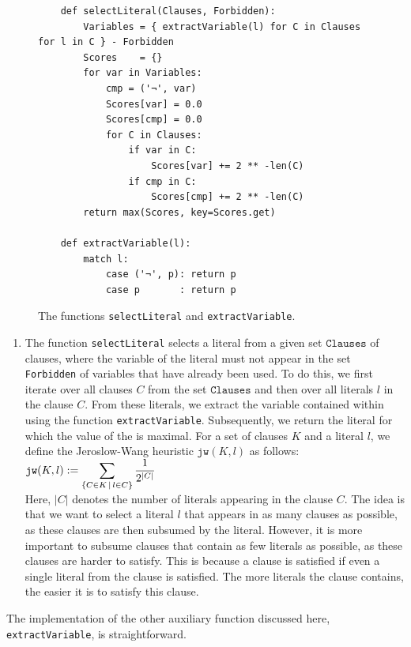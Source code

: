 \begin{figure}[!ht]
  \centering
\begin{verbatim}
    def selectLiteral(Clauses, Forbidden):
        Variables = { extractVariable(l) for C in Clauses for l in C } - Forbidden
        Scores    = {} 
        for var in Variables:
            cmp = ('¬', var)
            Scores[var] = 0.0
            Scores[cmp] = 0.0
            for C in Clauses:
                if var in C:
                    Scores[var] += 2 ** -len(C)
                if cmp in C: 
                    Scores[cmp] += 2 ** -len(C)
        return max(Scores, key=Scores.get)

    def extractVariable(l):
        match l:
            case ('¬', p): return p
            case p       : return p
\end{verbatim}
\vspace*{-0.3cm}
  \caption{The functions \texttt{selectLiteral} and \texttt{extractVariable}.}
  \label{fig:solve-aux}
\end{figure}
\begin{enumerate}
\item The function \texttt{selectLiteral} selects a literal from 
a given set $\texttt{Clauses}$ of clauses, where the variable of the literal must not appear in the set
\texttt{Forbidden} of variables that have already been used.
To do this, we first iterate over all clauses $C$ from the set $\texttt{Clauses}$ and then over all literals $l$
in the clause $C$. From these literals, we extract the variable contained within using the function
\texttt{extractVariable}. Subsequently, we return the literal for which the value of the
  \cite{jeroslow:1990} is maximal. For a
set of clauses $K$ and a 
literal $l$, we define the Jeroslow-Wang heuristic $\texttt{jw}(K, l)$ as follows:
\\[0.2cm]
\hspace*{1.3cm}
$\displaystyle\mathtt{jw}(K, l) := \sum\limits_{\{C \in K \,\mid\, l \in C\}} \frac{1}{2^{|C|}}$
\\[0.2cm]
Here, $|C|$ denotes the number of literals appearing in the clause $C$. The idea is that we
want to select a literal $l$ that appears in as many clauses as possible, as these clauses are then
subsumed by the literal. However, it is more important to subsume clauses that contain as few
literals as possible, as these clauses are harder to satisfy. This is because a clause
is satisfied if even a single literal from the clause is satisfied. The more literals the
clause contains, the easier it is to satisfy this clause.
\end{enumerate}
The implementation of the other auxiliary function discussed here, \texttt{extractVariable}, is
straightforward.

